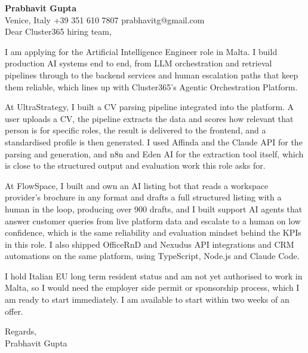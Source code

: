 \documentclass[a4paper,10.5pt]{article}
\begin{document}
\textbf{Prabhavit Gupta}\\
Venice, Italy \textbar{} +39 351 610 7807 \textbar{} prabhavitg@gmail.com\\[10pt]
Dear Cluster365 hiring team,

I am applying for the Artificial Intelligence Engineer role in Malta. I build production AI systems end to end, from LLM orchestration and retrieval pipelines through to the backend services and human escalation paths that keep them reliable, which lines up with Cluster365's Agentic Orchestration Platform.

At UltraStrategy, I built a CV parsing pipeline integrated into the platform. A user uploads a CV, the pipeline extracts the data and scores how relevant that person is for specific roles, the result is delivered to the frontend, and a standardised profile is then generated. I used Affinda and the Claude API for the parsing and generation, and n8n and Eden AI for the extraction tool itself, which is close to the structured output and evaluation work this role asks for.

At FlowSpace, I built and own an AI listing bot that reads a workspace provider's brochure in any format and drafts a full structured listing with a human in the loop, producing over 900 drafts, and I built support AI agents that answer customer queries from live platform data and escalate to a human on low confidence, which is the same reliability and evaluation mindset behind the KPIs in this role. I also shipped OfficeRnD and Nexudus API integrations and CRM automations on the same platform, using TypeScript, Node.js and Claude Code.

I hold Italian EU long term resident status and am not yet authorised to work in Malta, so I would need the employer side permit or sponsorship process, which I am ready to start immediately. I am available to start within two weeks of an offer.

Regards,\\
Prabhavit Gupta
\end{document}
